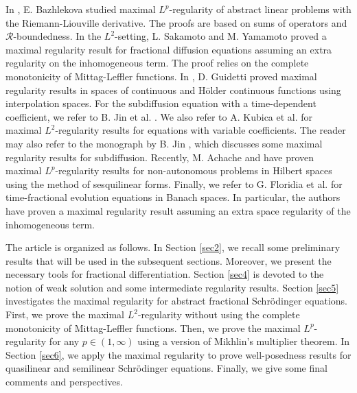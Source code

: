 \documentclass[reqno]{amsart}
\numberwithin{equation}{section}
\begin{document}
In \cite{Baz01}, E. Bazhlekova studied maximal $L^p$-regularity of abstract linear problems with the Riemann-Liouville derivative. The proofs are based on sums of operators and $\mathcal{R}$-boundedness. In the $L^2$-setting, L. Sakamoto and M. Yamamoto \cite{SY11} proved a maximal regularity result for fractional diffusion equations assuming an extra regularity on the inhomogeneous term. The proof relies on the complete monotonicity of Mittag-Leffler functions. In \cite{Gu19}, D. Guidetti proved maximal regularity results in spaces of continuous and Hölder continuous functions using interpolation spaces. For the subdiffusion equation with a time-dependent coefficient, we refer to B. Jin et al. \cite{JLZ19}. We also refer to A. Kubica et al. \cite{KRY20} for maximal $L^2$-regularity results for equations with variable coefficients. The reader may also refer to the monograph by B. Jin \cite{Ji21}, which discusses some maximal regularity results for subdiffusion. Recently, M. Achache \cite{Ach22} and \cite{Ach24} have proven maximal $L^p$-regularity results for non-autonomous problems in Hilbert spaces using the method of sesquilinear forms. Finally, we refer to G. Floridia et al. \cite{FGY25} for time-fractional evolution equations in Banach spaces. In particular, the authors have proven a maximal regularity result assuming an extra space regularity of the inhomogeneous term.

The article is organized as follows. In Section \ref{sec2}, we recall some preliminary results that will be used in the subsequent sections. Moreover, we present the necessary tools for fractional differentiation. Section \ref{sec4} is devoted to the notion of weak solution and some intermediate regularity results. Section \ref{sec5} investigates the maximal regularity for abstract fractional Schrödinger equations. First, we prove the maximal $L^2$-regularity without using the complete monotonicity of Mittag-Leffler functions. Then, we prove the maximal $L^p$-regularity for any $p\in (1,\infty)$ using a version of Mikhlin's multiplier theorem. In Section \ref{sec6}, we apply the maximal regularity to prove well-posedness results for quasilinear and semilinear Schr\"odinger equations. Finally, we give some final comments and perspectives.
\end{document}
